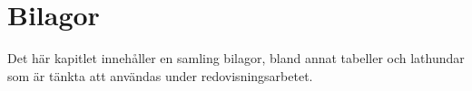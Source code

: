 \chapter{Bilagor}

Det här kapitlet innehåller en samling bilagor, bland annat tabeller och lathundar som är tänkta att användas under redovisningsarbetet.


